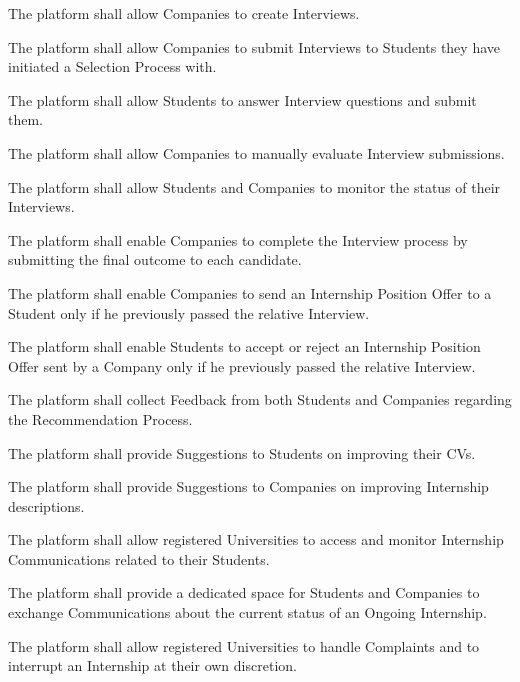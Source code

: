 \begin{enumerate}[label={\color{titleColor}[R\arabic*]}]
    \item The platform shall allow Companies to create Interviews.
    \item The platform shall allow Companies to submit Interviews to Students they have initiated a Selection Process with.
    \item The platform shall allow Students to answer Interview questions and submit them.
    \item The platform shall allow Companies to manually evaluate Interview submissions.
    \item The platform shall allow Students and Companies to monitor the status of their Interviews.
    \item The platform shall enable Companies to complete the Interview process by submitting the final outcome to each candidate.

    \item The platform shall enable Companies to send an Internship Position Offer to a Student only if he previously passed the relative Interview.
    \item The platform shall enable Students to accept or reject an Internship Position Offer sent by a Company only if he previously passed the relative Interview.
    
    \item The platform shall collect Feedback from both Students and Companies regarding the Recommendation Process.
    \item The platform shall provide Suggestions to Students on improving their CVs.
    \item The platform shall provide Suggestions to Companies on improving Internship descriptions.
    
    \item The platform shall allow registered Universities to access and monitor Internship Communications related to their Students.
    \item The platform shall provide a dedicated space for Students and Companies to exchange Communications about the current status of an Ongoing Internship.
    \item The platform shall allow registered Universities to handle Complaints and to interrupt an Internship at their own discretion.
\end{enumerate}


